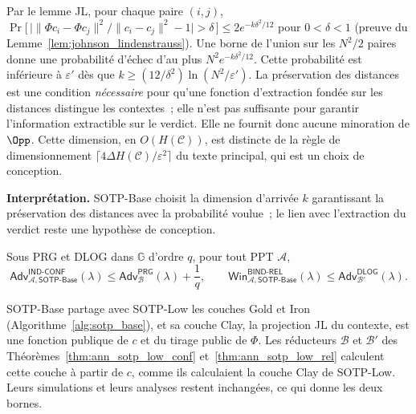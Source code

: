 \begin{sloppypar}
\begin{Preuve}
Par le lemme JL, pour chaque paire $(i,j)$,
$\Pr\bigl[\,\bigl|\|\Phi c_i-\Phi c_j\|^2/\|c_i-c_j\|^2 - 1\bigr| > \delta\,\bigr]
\leq 2e^{-k\delta^2/12}$ pour $0 < \delta < 1$ (preuve du Lemme~\ref{lem:johnson_lindenstrauss}). Une borne de l'union sur les $N^2/2$ paires donne une
probabilit\'e d'\'echec d'au plus $N^2 e^{-k\delta^2/12}$. Cette probabilit\'e est inf\'erieure \`a $\varepsilon'$
d\`es que $k \geq (12/\delta^2)\ln(N^2/\varepsilon')$.
La pr\'eservation des distances est une condition \emph{n\'ecessaire} pour qu'une
fonction d'extraction fond\'ee sur les distances distingue les contextes~; elle
n'est pas suffisante pour garantir l'information extractible sur le verdict.
Elle ne fournit donc aucune minoration de $\Opp$. Cette dimension, en
$O(H(\mathcal{C}))$, est distincte de la r\`egle de dimensionnement
$\lceil 4\Delta H(\mathcal{C})/\varepsilon^2 \rceil$ du texte principal, qui est
un choix de conception.
\end{Preuve}

\noindent\textbf{Interpr\'etation.} SOTP-Base choisit la dimension d'arriv\'ee
$k$ garantissant la pr\'eservation des distances avec la probabilit\'e voulue~;
le lien avec l'extraction du verdict reste une hypoth\`ese de conception.

\begin{corollary}\label{cor:ann_sotp_base_reductions}
Sous PRG et DLOG dans $\mathbb{G}$ d'ordre $q$, pour tout PPT $\mathcal{A}$,
\begin{equation}
\mathsf{Adv}^{\mathsf{IND\text{-}CONF}}_{\mathcal{A},\mathsf{SOTP\text{-}Base}}(\lambda)
\leq \mathsf{Adv}^{\mathsf{PRG}}_{\mathcal{B}}(\lambda) + \frac{1}{q},
\qquad
\mathsf{Win}^{\mathsf{BIND\text{-}REL}}_{\mathcal{A},\mathsf{SOTP\text{-}Base}}(\lambda)
\leq \mathsf{Adv}^{\mathsf{DLOG}}_{\mathcal{B}'}(\lambda).
\end{equation}
\end{corollary}

\begin{Preuve}
SOTP-Base partage avec SOTP-Low les couches Gold et Iron
(Algorithme~\ref{alg:sotp_base}), et sa couche Clay, la projection JL du contexte, est
une fonction publique de $c$ et du tirage public de $\Phi$. Les r\'educteurs
$\mathcal{B}$ et $\mathcal{B}'$ des Th\'eor\`emes~\ref{thm:ann_sotp_low_conf}
et~\ref{thm:ann_sotp_low_rel} calculent cette couche \`a partir de $c$, comme ils
calculaient la couche Clay de SOTP-Low. Leurs simulations et leurs analyses restent
inchang\'ees, ce qui donne les deux bornes.
\end{Preuve}
\end{sloppypar}

